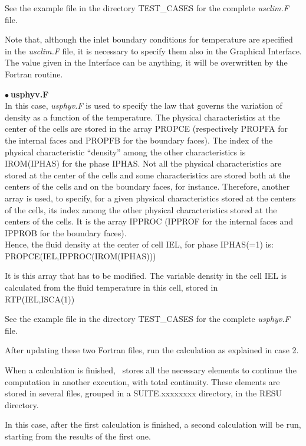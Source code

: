 See the example file in the directory TEST\_CASES for the complete
{\itshape usclim.F} file.

Note that, although the inlet boundary conditions for temperature are specified
in the {\itshape usclim.F} file, it is necessary to specify them also in the
Graphical Interface. The value given in the Interface can be anything, it will
be overwritten by the Fortran routine.


$\bullet\ $\textbf{usphyv.F}\\
In this case, {\itshape usphyv.F} is used to specify the law that governs the
variation of density as a function of the temperature. The physical
characteristics at the center of the cells are stored in the array PROPCE
(respectively PROPFA for the internal faces and PROPFB for the boundary faces).
The index of the physical characteristic ``density'' among the other
characteristics is IROM(IPHAS) for the phase IPHAS.
Not all the physical characteristics are stored at the center of the cells and
some characteristics are stored both at the centers of the cells and on the
boundary faces, for instance.
Therefore, another array is used, to specify, for a given physical
characteristics stored at the centers of the cells, its index among the other
physical characteristics stored at the centers of the cells. It is the array
IPPROC (IPPROF for the internal faces and IPPROB for the boundary faces).\\
Hence, the fluid density at the center of cell IEL, for phase IPHAS(=1) is:\\
PROPCE(IEL,IPPROC(IROM(IPHAS)))

It is this array that has to be modified. The variable density in the cell IEL
is calculated from the fluid temperature in this cell, stored in\\
RTP(IEL,ISCA(1))

See the example file in the directory TEST\_CASES for the complete
{\itshape usphyv.F} file.


After updating these two Fortran files, run the calculation as explained in case
2.


\newpage
When a calculation is finished, \CS\ stores all the necessary elements to
continue the computation in another execution, with total continuity. These
elements are stored in several files, grouped in a SUITE.xxxxxxxx directory, in
the RESU directory.

In this case, after the first calculation is finished, a second calculation will
be run, starting from the results of the first one.


